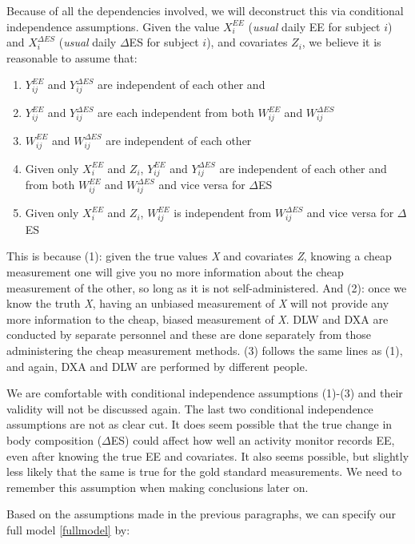 \documentclass[11pt]{article}\usepackage[]{graphicx}\usepackage[]{color}
\begin{document}
Because of all the dependencies involved, we will deconstruct this via conditional independence assumptions. Given the value $X_i^{EE}$ (\emph{usual} daily EE for subject $i$) and $X_i^{\Delta ES}$ (\emph{usual} daily $\Delta$ES for subject $i$), and covariates $Z_i$, we believe it is reasonable to assume that:

\begin{enumerate}
\item
$Y_{ij}^{EE}$ and $Y_{ij}^{\Delta ES}$ are independent of each other and 
\item
$Y_{ij}^{EE}$ and $Y_{ij}^{\Delta ES}$ are each independent from both $W_{ij}^{EE}$ and $W_{ij}^{\Delta ES}$
\item
$W_{ij}^{EE}$ and $W_{ij}^{\Delta ES}$ are independent of each other
\item
Given only $X_i^{EE}$ and $Z_i$, $Y_{ij}^{EE}$ and $Y_{ij}^{\Delta ES}$ are independent of each other and from both $W_{ij}^{EE}$ and $W_{ij}^{\Delta ES}$ and vice versa for $\Delta$ES
\item
Given only $X_i^{EE}$ and $Z_i$, $W_{ij}^{EE}$ is independent from $W_{ij}^{\Delta ES}$ and vice versa for $\Delta$ES

\end{enumerate}

 This is because  (1): given the true values \emph{X} and covariates \emph{Z}, knowing a cheap measurement one will give you no more information about the cheap measurement of the other, so long as it is not self-administered. And (2): once we know the truth \emph{X}, having an unbiased measurement of \emph{X} will not provide any more information to the cheap, biased measurement of \emph{X}. DLW and DXA are conducted by separate personnel and these are done separately from those administering the cheap measurement methods. (3) follows the same lines as (1), and again, DXA and DLW are performed by different people.

We are comfortable with conditional independence assumptions (1)-(3) and their validity will not be discussed again. The last two conditional independence assumptions are not as clear cut. It does seem possible that the true change in body composition ($\Delta$ES) could affect how well an activity monitor records EE, even after knowing the true EE and covariates. It also seems possible, but slightly less likely that the same is true for the gold standard measurements. We need to remember this assumption when making conclusions later on.

Based on the assumptions made in the previous paragraphs, we can specify our full model \eqref{fullmodel} by:
\end{document}
